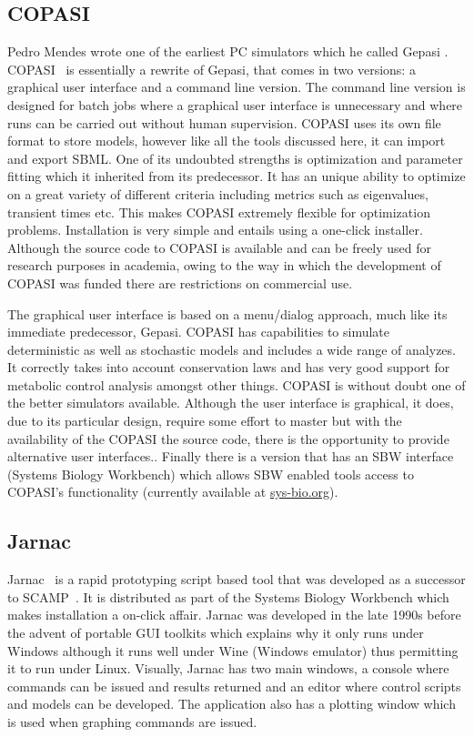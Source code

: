\documentclass[12pt]{article}
\begin{document}
\subsection{COPASI}

Pedro Mendes wrote one of the earliest PC simulators which he called
Gepasi \citep{Gepasi:1993}. COPASI~\citep{Copasi2006} is essentially a rewrite of
Gepasi, that comes in two versions: a graphical user interface and a
command line version. The command line version is designed for batch
jobs where a graphical user interface is unnecessary and where runs
can be carried out without human supervision. COPASI uses its own
file format to store models, however like all the tools discussed
here, it can import and export SBML. One of its undoubted strengths
is optimization and parameter fitting which it inherited from its
predecessor. It has an unique ability to optimize on a great variety
of different criteria including metrics such as eigenvalues,
transient times etc. This makes COPASI extremely flexible for
optimization problems. Installation is very simple and entails using
a one-click installer. Although the source code to COPASI is
available and can be freely used for research purposes in academia,
owing to the way in which the development of COPASI was funded there
are restrictions on commercial use.

The graphical user interface is based on a menu/dialog approach,
much like its immediate predecessor, Gepasi. COPASI has
capabilities to simulate deterministic as well as stochastic models
and includes a wide range of analyzes. It correctly takes into
account conservation laws and has very good support for metabolic
control analysis amongst other things. COPASI is without doubt one
of the better simulators available. Although the user interface is
graphical, it does, due to its particular design, require some effort
to master but with the availability of the COPASI the source code,
there is the opportunity to provide alternative user interfaces.. Finally there is a
version that has an SBW interface (Systems Biology Workbench) which
allows SBW enabled tools access to COPASI's functionality (currently available at \url{sys-bio.org}).

\subsection{Jarnac}

Jarnac~\citep{sauro:2000} is a rapid prototyping script based tool
that was developed as a successor to SCAMP~\citep{SauroF91}. It is
distributed as part of the Systems Biology Workbench which makes
installation a on-click affair. Jarnac was developed in the late
1990s before the advent of portable GUI toolkits which explains why
it only runs under Windows although it runs well under Wine
(Windows emulator) thus permitting it to run under Linux. Visually,
Jarnac has two main windows, a console where commands can be issued
and results returned and an editor where control scripts and models
can be developed. The application also has a plotting window which
is used when graphing commands are issued.
\end{document}
